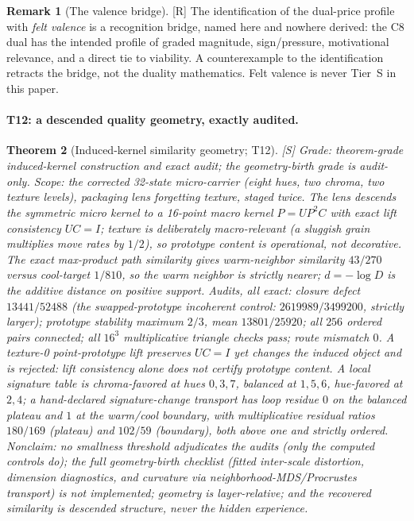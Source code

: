 \documentclass[11pt]{article}
\newcommand{\gradeS}{\textsf{[S]}}
\newcommand{\gradeR}{\textsf{[R]}}
\newtheorem{theorem}{Theorem}[section]
\theoremstyle{definition}
\newtheorem{remark}[theorem]{Remark}
\begin{document}
\begin{remark}[The valence bridge]
\gradeR{} The identification of the dual-price profile with \emph{felt
valence} is a recognition bridge, named here and nowhere derived: the C8 dual
has the intended profile of graded magnitude, sign/pressure, motivational
relevance, and a direct tie to viability. A counterexample to the identification
retracts the bridge, not the duality mathematics. Felt valence is never
Tier~S in this paper.
\end{remark}

\paragraph{T12: a descended quality geometry, exactly audited.}
\begin{theorem}[Induced-kernel similarity geometry; T12]
\gradeS{} \emph{Grade:} theorem-grade induced-kernel construction and exact
audit; the geometry-birth grade is audit-only. \emph{Scope:} the corrected
32-state micro-carrier (eight hues, two chroma, two texture levels), packaging
lens forgetting texture, staged twice. The lens descends the symmetric micro
kernel to a 16-point macro kernel $\hat P = U P^2 C$ with exact lift
consistency $UC = I$; texture is deliberately macro-relevant (a sluggish
grain multiplies move rates by $1/2$), so prototype content is operational,
not decorative. The exact max-product path similarity gives warm-neighbor
similarity $43/270$ versus cool-target $1/810$, so the warm neighbor is
strictly nearer; $d = -\log D$ is the additive distance on positive support.
Audits, all exact: closure defect $13441/52488$ (the swapped-prototype
incoherent control: $2619989/3499200$, strictly larger); prototype stability
maximum $2/3$, mean $13801/25920$; all $256$ ordered pairs connected; all
$16^3$ multiplicative triangle checks pass; route mismatch $0$. A texture-0
point-prototype lift preserves $UC=I$ yet changes the induced object and is
rejected: lift consistency alone does not certify prototype content. A local
signature table is chroma-favored at hues $0,3,7$, balanced at $1,5,6$,
hue-favored at $2,4$; a hand-declared signature-change transport has loop
residue $0$ on the balanced plateau and $1$ at the warm/cool boundary, with
multiplicative residual ratios $180/169$ (plateau) and $102/59$ (boundary),
both above one and strictly ordered. \emph{Nonclaim:} no smallness threshold
adjudicates the audits (only the computed controls do); the full
geometry-birth checklist (fitted inter-scale distortion, dimension
diagnostics, and curvature via neighborhood-MDS/Procrustes transport) is
not implemented; geometry is layer-relative; and the recovered similarity is
descended structure, never the hidden experience.
\end{theorem}
\end{document}
